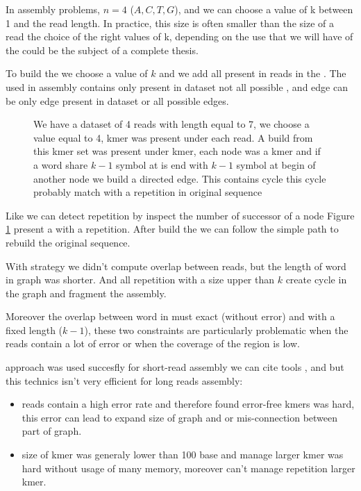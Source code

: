 \documentclass[main]{subfiles}
\begin{document}
In assembly problems, $n = 4$ (${A, C, T, G}$), and we can choose a value of k between 1 and the read length. In practice, this size is often smaller than the size of a read the choice of the right values of k, depending on the use that we will have of the \DBG could be the subject of a complete thesis.

To build the \DBG we choose a value of $k$ and we add all \kmer present in reads in the \DBG. The \DBG used in assembly contains only \kmer present in dataset not all possible \kmer, and edge can be only edge present in dataset or all possible edges.

\begin{figure}[ht]
    \center
    
    \caption{We have a dataset of 4 reads with length equal to 7, we choose a value equal to 4, kmer was present under each read. A \DBG build from this kmer set was present under kmer, each node was a kmer and if a word share $k - 1$ symbol at is end with $k - 1$ symbol at begin of another node we build a directed edge. This \DBG contains cycle this cycle probably match with a repetition in original sequence}
    \label{intro:fig:dbg:graph}
\end{figure}

Like \OLC we can detect repetition by inspect the number of successor of a node Figure \ref{intro:fig:dbg:graph} present a \DBG with a repetition. After build the \DBG we can follow the simple path to rebuild the original sequence.

With \DBG strategy we didn't compute overlap between reads, but the length of word in graph was shorter. And all repetition with a size upper than $k$ create cycle in the graph and fragment the assembly.

Moreover the overlap between word in \DBG must exact (without error) and with a fixed length ($k - 1$), these two constraints are particularly problematic when the reads contain a lot of error or when the coverage of the region is low.

\DBG approach was used succesfly for short-read assembly we can cite tools  \cite{spades},  \cite{minia} and \cite{megahit} but this technics isn't very efficient for long reads assembly:
\begin{itemize}
    \item reads contain a high error rate and therefore found error-free kmers was hard, this error can lead to expand size of graph and or mis-connection between part of graph.
    \item size of kmer was generaly lower than 100 base and manage larger kmer was hard without usage of many memory, moreover \DBG can't manage repetition larger kmer.
\end{itemize}
\end{document}
